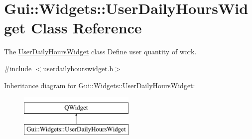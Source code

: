 \hypertarget{classGui_1_1Widgets_1_1UserDailyHoursWidget}{\section{Gui\-:\-:Widgets\-:\-:User\-Daily\-Hours\-Widget Class Reference}
\label{classGui_1_1Widgets_1_1UserDailyHoursWidget}
}


The \hyperlink{classGui_1_1Widgets_1_1UserDailyHoursWidget}{User\-Daily\-Hours\-Widget} class Define user quantity of work.  




{\ttfamily \#include $<$userdailyhourswidget.\-h$>$}

Inheritance diagram for Gui\-:\-:Widgets\-:\-:User\-Daily\-Hours\-Widget\-:\begin{figure}[H]
\begin{center}
\leavevmode
\includegraphics[height=2.000000cm]{d1/d94/classGui_1_1Widgets_1_1UserDailyHoursWidget}
\end{center}
\end{figure}
